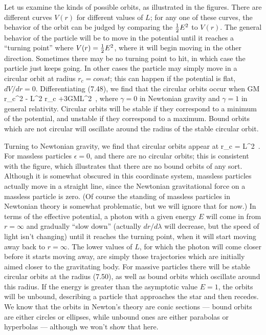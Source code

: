 Let us examine the kinds of possible orbits, as illustrated in the
figures.  There are different curves $V(r)$ for different values
of $L$; for any one of these curves, the behavior of the orbit can be
judged by comparing the ${1\over 2}E^2$ to $V(r)$.  The general behavior of
the particle will be to move in the potential until it reaches a
``turning point'' where $V(r)={1\over 2}E^2$, where it will begin moving 
in the other direction.  Sometimes there may be no turning point to hit,
in which case the particle just keeps going.  In other cases the
particle may simply move in a circular orbit at radius $r_c= const$; this 
can happen if the potential is flat, $dV/dr=0$.  Differentiating
(7.48), we find that the circular orbits occur when
\be
  \epsilon GM r_c^2 - L^2 r_c +3GML^2\ ,\label{7.49}
\ee
where $\gamma=0$ in Newtonian gravity and $\gamma=1$ in general
relativity.  Circular orbits will be stable if they correspond to
a minimum of the potential, and unstable if they correspond to a
maximum.  Bound orbits which are not circular will oscillate
around the radius of the stable circular orbit.

\begin{figure}
  \centerline{
  }
  \vskip-2cm
\end{figure}

\begin{figure}
  \centerline{
  }
  \vskip-2cm
\end{figure}

Turning to Newtonian gravity, we find that circular orbits appear at
\be
  r_c = {{L^2}}\ .\label{7.50}
\ee
For massless particles $\epsilon=0$, and there are no circular orbits;
this is consistent with the figure, which illustrates that there are no
bound orbits of any sort.  Although it is somewhat obscured in this
coordinate system, massless particles actually move in a straight
line, since the Newtonian gravitational force on a massless particle is
zero.  (Of course the standing of massless particles in Newtonian theory
is somewhat problematic, but we will ignore that for now.)  In terms of
the effective potential, a photon with a given energy $E$ will come in 
from $r=\infty$ and gradually ``slow down'' (actually $dr/d\lambda$
will decrease, but the speed of light isn't changing) until it reaches
the turning point, when it will start moving away back to 
$r=\infty$.  The lower values of $L$, for which the photon will come
closer before it starts moving away, are simply those trajectories which
are initially aimed closer to the gravitating body.
For massive particles there will be stable circular orbits at the
radius (7.50), as well as bound orbits which oscillate around this
radius.  If the energy is greater than the asymptotic value $E=1$,
the orbits will be unbound, describing a particle that approaches the
star and then recedes.  We know that the orbits in Newton's theory are
conic sections --- bound orbits are either circles or ellipses, while
unbound ones are either parabolas or hyperbolas --- although we won't
show that here.

